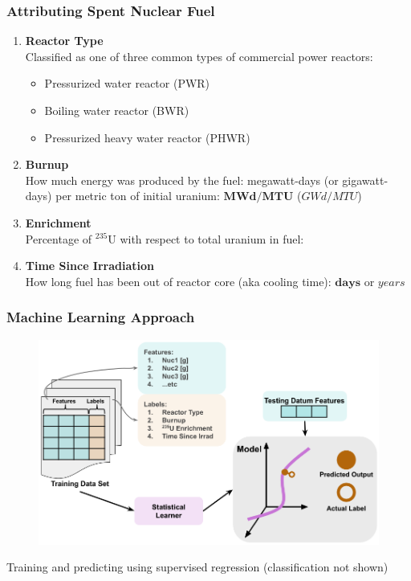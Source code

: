\begin{frame}
  \frametitle{Attributing Spent Nuclear Fuel}
  \begin{enumerate}
    \item \textbf{Reactor Type} \\
          Classified as one of three common types of commercial power reactors:
          \begin{itemize}
            \item Pressurized water reactor (PWR)
            \item Boiling water reactor (BWR)
            \item Pressurized heavy water reactor (PHWR)
          \end{itemize}
    \item \textbf{Burnup} \\
          How much energy was produced by the fuel: megawatt-days (or 
          gigawatt-days) per metric ton of initial uranium: $\mathbf{MWd/MTU}$ 
          ($GWd/MTU$)
    \item {} \textbf{Enrichment} \\
          Percentage of ${}^{235}\text{U}$ with respect to total uranium in 
          fuel: 
    \item \textbf{Time Since Irradiation} \\
          How long fuel has been out of reactor core (aka cooling time): 
          $\mathbf{days}$ or $years$
  \end{enumerate}
\end{frame}


\begin{frame}
  \frametitle{Machine Learning Approach}
  \begin{adjustwidth}{-10pt}{-10pt}
  \begin{figure}
    \centering
    \includegraphics[width=1.05\textwidth]{./figures/pres_version_SupervisedRegression.png}
  \end{figure}
  Training and predicting using supervised regression (classification not shown)
  \end{adjustwidth}
\end{frame}


